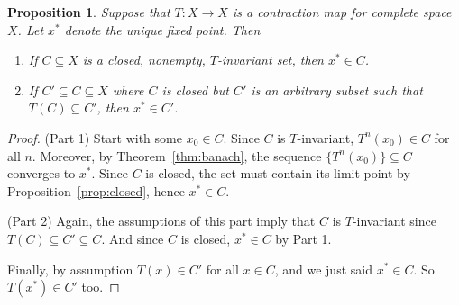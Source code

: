 \documentclass[12pt]{article}
\theoremstyle{plain}
\newtheorem{prop}[thm]{Proposition}
\theoremstyle{definition}
\theoremstyle{remark}
\begin{document}
\begin{prop}
Suppose that $T: X\rightarrow X$ is a contraction map for complete space
$X$. Let $x^*$ denote the unique fixed point. Then
\begin{enumerate}
  \item If $C\subseteq X$ is a closed, nonempty, $T$-invariant set, then
    $x^* \in C$.
  \item If $C' \subseteq C \subseteq X$ where $C$ is closed but $C'$ is
    an arbitrary subset such that $T(C) \subseteq C'$, then $x^* \in
    C'$.
\end{enumerate}
\end{prop}
\begin{proof}
(Part 1) Start with some $x_0\in C$. Since $C$ is $T$-invariant,
$T^n(x_0) \in C$ for all $n$. Moreover, by Theorem~\ref{thm:banach},
the sequence $\{T^n(x_0)\}\subseteq C$ converges to $x^*$. Since $C$ is
closed, the set must contain its limit point by
Proposition~\ref{prop:closed}, hence $x^*\in C$.

(Part 2) Again, the assumptions of this part imply that $C$ is
$T$-invariant since $T(C)\subseteq C' \subseteq C$.  And since $C$ is
closed, $x^*\in C$ by Part 1.

Finally, by assumption $T(x) \in C'$ for all $x \in C$, and we just said
$x^*\in C$. So $T(x^*)\in C'$ too.
\end{proof}





\end{document}
